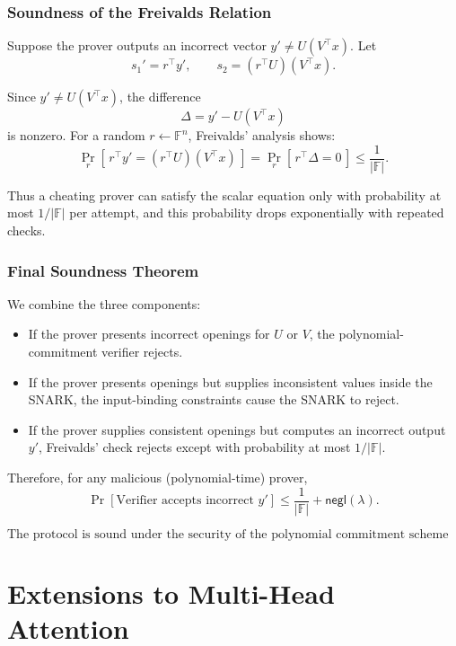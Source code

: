 \documentclass[11pt]{article}
\begin{document}
\subsubsection{Soundness of the Freivalds Relation}

Suppose the prover outputs an incorrect vector $y' \neq U(V^\top x)$.
Let
\[
  s_1' = r^\top y', \qquad
  s_2 = (r^\top U)(V^\top x).
\]

Since $y' \neq U(V^\top x)$, the difference
\[
  \Delta = y' - U(V^\top x)
\]
is nonzero.
For a random $r \leftarrow \mathbb{F}^n$, Freivalds’ analysis shows:
\[
  \Pr_r[\,r^\top y' = (r^\top U)(V^\top x)\,]
  =
  \Pr_r[\,r^\top \Delta = 0\,]
  \le \frac{1}{|\mathbb{F}|}.
\]

Thus a cheating prover can satisfy the scalar equation only with
probability at most $1/|\mathbb{F}|$ per attempt, and this probability
drops exponentially with repeated checks.

\subsubsection{Final Soundness Theorem}

We combine the three components:

\begin{itemize}
  \item If the prover presents incorrect openings for $U$ or $V$, the
        polynomial-commitment verifier rejects.
  \item If the prover presents openings but supplies inconsistent values
        inside the SNARK, the input-binding constraints cause the SNARK
        to reject.
  \item If the prover supplies consistent openings but computes an
        incorrect output $y'$, Freivalds’ check rejects except with
        probability at most $1/|\mathbb{F}|$.
\end{itemize}

Therefore, for any malicious (polynomial-time) prover,
\[
  \Pr[\text{Verifier accepts incorrect } y']
  \le
  \frac{1}{|\mathbb{F}|} + \mathsf{negl}(\lambda).
\]

\[
  \boxed{
    \text{The protocol is sound under the security of the polynomial
    commitment scheme and the underlying SNARK.}
  }
\]
\section{Extensions to Multi-Head Attention}
\end{document}
